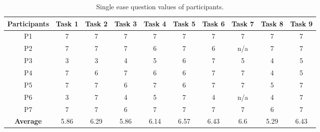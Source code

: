 \begin{table}
    \centering
    \begin{tabular}{c c c c c c c c c c}
        \hline
        \textbf{Participants} & \textbf{Task 1} & \textbf{Task 2} & \textbf{Task 3} & \textbf{Task 4} & \textbf{Task 5} & \textbf{Task 6} & \textbf{Task 7} & \textbf{Task 8} & \textbf{Task 9} \\
        \hline
        P1 & 7 & 7 & 7 & 7 & 7 & 7 & 7 & 7 & 7 \\
        \hline
        P2 & 7 & 7 & 7 & 6 & 7 & 6 & n/a & 7 & 7 \\
        \hline
        P3 & 3 & 3 & 4 & 5 & 6 & 7 & 5 & 4 & 5 \\
        \hline
        P4 & 7 & 6 & 7 & 6 & 6 & 7 & 7 & 4 & 5 \\
        \hline
        P5 & 7 & 7 & 6 & 7 & 6 & 7 & 7 & 5 & 7 \\
        \hline
        P6 & 3 & 7 & 4 & 5 & 7 & 4 & n/a & 4 & 7 \\
        \hline
        P7 & 7 & 7 & 6 & 7 & 7 & 7 & 7 & 6 & 7 \\
        \hline
        \textbf{Average} & 5.86 & 6.29 & 5.86 & 6.14 & 6.57 & 6.43 & 6.6 & 5.29 & 6.43 \\
        \hline
    \end{tabular}
    \vspace{1em}
    \caption*{Single ease question values of participants.}
    \label{table:seq_scoring}
\end{table}
